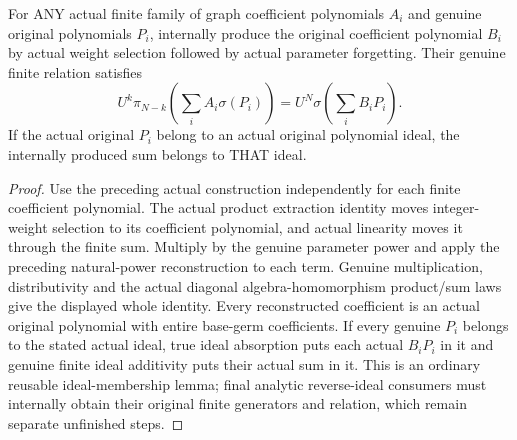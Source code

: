 \begin{theorem}
\label{hir:relative-normal-graph-weight-finite-relation-reconstruction}
\leanok
For ANY actual finite family of graph coefficient polynomials $A_i$ and genuine original polynomials $P_i$, internally produce the original coefficient polynomial $B_i$ by actual weight selection followed by actual parameter forgetting. Their genuine finite relation satisfies
\[U^k\pi_{N-k}\!\left(\sum_i A_i\sigma(P_i)\right)
 = U^N\sigma\!\left(\sum_i B_i P_i\right).\]
If the actual original $P_i$ belong to an actual original polynomial ideal, the internally produced sum belongs to THAT ideal.
\end{theorem}
\begin{proof}
Use the preceding actual construction independently for each finite coefficient polynomial. The actual product extraction identity moves integer-weight selection to its coefficient polynomial, and actual linearity moves it through the finite sum. Multiply by the genuine parameter power and apply the preceding natural-power reconstruction to each term. Genuine multiplication, distributivity and the actual diagonal algebra-homomorphism product/sum laws give the displayed whole identity. Every reconstructed coefficient is an actual original polynomial with entire base-germ coefficients. If every genuine $P_i$ belongs to the stated actual ideal, true ideal absorption puts each actual $B_iP_i$ in it and genuine finite ideal additivity puts their actual sum in it. This is an ordinary reusable ideal-membership lemma; final analytic reverse-ideal consumers must internally obtain their original finite generators and relation, which remain separate unfinished steps.
\end{proof}
